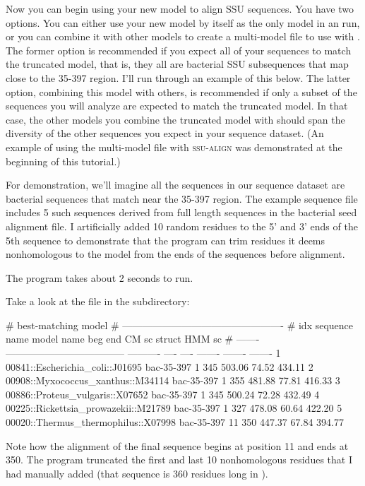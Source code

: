 Now you can begin using your new model  to align
SSU sequences. You have two options.  You can either use your new
model by itself as the only model in an  run, or you
can combine it with other models to create a multi-model file to use
with . The former option is recommended if you expect
all of your sequences to match the truncated model, that is, they all
are bacterial SSU subsequences that map close to the 35-397
region. I'll run through an example of this below. The latter option,
combining this model with others, is recommended if only a subset of
the sequences you will analyze are expected to match the truncated
model. In that case, the other models you combine the truncated model
with should span the diversity of the other sequences you expect in
your sequence dataset. (An example of using the multi-model file
 with \textsc{ssu-align} was
demonstrated at the beginning of this tutorial.)

For demonstration, we'll imagine all the sequences in our sequence
dataset are bacterial sequences that match near the 35-397 region. The
example sequence file  includes 5 such sequences
derived from full length sequences in the bacterial seed alignment
 file. I artificially added 10
random residues to the 5' and 3' ends of the 5th sequence to
demonstrate that the program can trim residues it deems nonhomologous
to the model from the ends of the sequences before alignment.


The program takes about 2 seconds to run. 

Take a look at the  file in the 
subdirectory:

\begin{sreoutputtiny}
#                                                               best-matching model               
#                                                -------------------------------------------------
#     idx  sequence name                         model name   beg   end    CM sc   struct   HMM sc
# -------  ------------------------------------  ----------  ----  ----  -------  -------  -------
        1  00841::Escherichia_coli::J01695       bac-35-397     1   345   503.06    74.52   434.11
        2  00908::Myxococcus_xanthus::M34114     bac-35-397     1   355   481.88    77.81   416.33
        3  00886::Proteus_vulgaris::X07652       bac-35-397     1   345   500.24    72.28   432.49
        4  00225::Rickettsia_prowazekii::M21789  bac-35-397     1   327   478.08    60.64   422.20
        5  00020::Thermus_thermophilus::X07998   bac-35-397    11   350   447.37    67.84   394.77
\end{sreoutputtiny}

Note how the alignment of the final sequence begins at position 11 and
ends at 350. The program truncated the first and last 10 nonhomologous
residues that I had manually added (that sequence is 360 residues long
in ).
